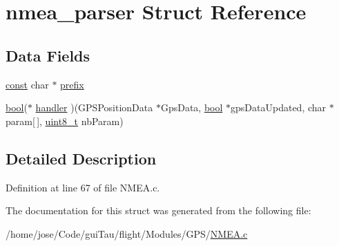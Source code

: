 \hypertarget{structnmea__parser}{\section{nmea\-\_\-parser Struct Reference}
\label{structnmea__parser}
}
\subsection*{Data Fields}
\begin{DoxyCompactItemize}
\item 
\hyperlink{group___n_a_m_e_ga7ae6d0e43244213b34de2c2b9aa30da6}{const} char $\ast$ \hyperlink{group___g_s_p_module_gaeb7052e0f799ff05ca599e5768f5b09f}{prefix}
\item 
\hyperlink{group___exported__types_gaf6a258d8f3ee5206d682d799316314b1}{bool}($\ast$ \hyperlink{group___g_s_p_module_ga3fd709a52dda42524d0394f5d226daff}{handler} )(G\-P\-S\-Position\-Data $\ast$Gps\-Data, \hyperlink{group___exported__types_gaf6a258d8f3ee5206d682d799316314b1}{bool} $\ast$gps\-Data\-Updated, char $\ast$param\mbox{[}$\,$\mbox{]}, \hyperlink{stdint_8h_aba7bc1797add20fe3efdf37ced1182c5}{uint8\-\_\-t} nb\-Param)
\end{DoxyCompactItemize}


\subsection{Detailed Description}


Definition at line 67 of file N\-M\-E\-A.\-c.



The documentation for this struct was generated from the following file\-:\begin{DoxyCompactItemize}
\item 
/home/jose/\-Code/gui\-Tau/flight/\-Modules/\-G\-P\-S/\hyperlink{_n_m_e_a_8c}{N\-M\-E\-A.\-c}\end{DoxyCompactItemize}
